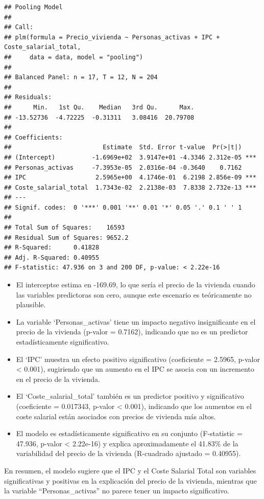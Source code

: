 \documentclass[
]{article}
\begin{document}
\begin{verbatim}
## Pooling Model
## 
## Call:
## plm(formula = Precio_vivienda ~ Personas_activas + IPC + Coste_salarial_total, 
##     data = data, model = "pooling")
## 
## Balanced Panel: n = 17, T = 12, N = 204
## 
## Residuals:
##      Min.   1st Qu.    Median   3rd Qu.      Max. 
## -13.52736  -4.72225  -0.31311   3.08416  20.79708 
## 
## Coefficients:
##                         Estimate  Std. Error t-value  Pr(>|t|)    
## (Intercept)          -1.6969e+02  3.9147e+01 -4.3346 2.312e-05 ***
## Personas_activas     -7.3953e-05  2.0316e-04 -0.3640    0.7162    
## IPC                   2.5965e+00  4.1746e-01  6.2198 2.856e-09 ***
## Coste_salarial_total  1.7343e-02  2.2138e-03  7.8338 2.732e-13 ***
## ---
## Signif. codes:  0 '***' 0.001 '**' 0.01 '*' 0.05 '.' 0.1 ' ' 1
## 
## Total Sum of Squares:    16593
## Residual Sum of Squares: 9652.2
## R-Squared:      0.41828
## Adj. R-Squared: 0.40955
## F-statistic: 47.936 on 3 and 200 DF, p-value: < 2.22e-16
\end{verbatim}

\begin{itemize}
\item
  El interceptse estima en -169.69, lo que sería el precio de la
  vivienda cuando las variables predictoras son cero, aunque este
  escenario es teóricamente no plausible.
\item
  La variable `Personas\_activas' tiene un impacto negativo
  insignificante en el precio de la vivienda (p-valor = 0.7162),
  indicando que no es un predictor estadísticamente significativo.
\item
  El `IPC' muestra un efecto positivo significativo (coeficiente =
  2.5965, p-valor \textless{} 0.001), sugiriendo que un aumento en el
  IPC se asocia con un incremento en el precio de la vivienda.
\item
  El `Coste\_salarial\_total' también es un predictor positivo y
  significativo (coeficiente = 0.017343, p-valor \textless{} 0.001),
  indicando que los aumentos en el coste salarial están asociados con
  precios de vivienda más altos.
\item
  El modelo es estadísticamente significativo en su conjunto
  (F-statistic = 47.936, p-valor \textless{} 2.22e-16) y explica
  aproximadamente el 41.83\% de la variabilidad del precio de la
  vivienda (R-cuadrado ajustado = 0.40955).
\end{itemize}

En resumen, el modelo sugiere que el IPC y el Coste Salarial Total son
variables significativas y positivas en la explicación del precio de la
vivienda, mientras que la variable ``Personas\_activas'' no parece tener
un impacto significativo.
\end{document}
